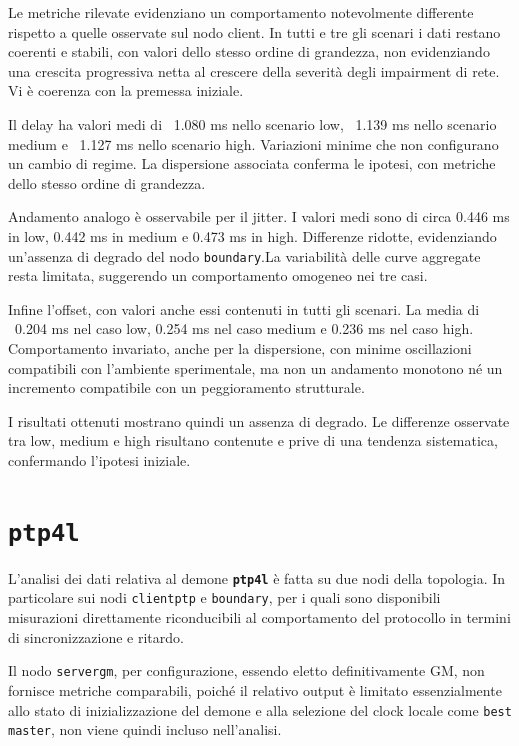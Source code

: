 Le metriche rilevate evidenziano un comportamento notevolmente differente
rispetto a quelle osservate sul nodo client. In tutti e tre gli scenari i dati restano
coerenti e stabili, con valori dello stesso ordine di grandezza, non evidenziando
una crescita progressiva netta al crescere della severità degli impairment di rete.
Vi è coerenza con la premessa iniziale.

Il delay ha valori medi di ~1.080 ms nello scenario low, ~1.139 ms nello scenario
medium e ~1.127 ms nello scenario high. Variazioni minime che non configurano un cambio
di regime. La dispersione associata conferma le ipotesi, con metriche dello stesso
ordine di grandezza.

Andamento analogo è osservabile per il jitter. I valori medi sono di circa 0.446
ms in low, 0.442 ms in medium e 0.473 ms in high. Differenze ridotte, evidenziando
un'assenza di degrado del nodo \texttt{boundary}.La variabilità delle curve
aggregate resta limitata, suggerendo un comportamento omogeneo nei tre casi.

Infine l'offset, con valori anche essi contenuti in tutti gli scenari. La media di
~0.204 ms nel caso low, 0.254 ms nel caso medium e 0.236 ms nel caso high.
Comportamento invariato, anche per la dispersione, con minime oscillazioni
compatibili con l'ambiente sperimentale, ma non un andamento monotono né un incremento
compatibile con un peggioramento strutturale.

I risultati ottenuti mostrano quindi un assenza di degrado. Le differenze
osservate tra low, medium e high risultano contenute e prive di una tendenza sistematica,
confermando l'ipotesi iniziale.

\section{\texttt{ptp4l}}
L'analisi dei dati relativa al demone \texttt{\textbf{ptp4l}} è fatta su due nodi
della topologia. In particolare sui nodi \texttt{clientptp} e \texttt{boundary}, per
i quali sono disponibili misurazioni direttamente riconducibili al comportamento del
protocollo in termini di sincronizzazione e ritardo.

Il nodo \texttt{servergm}, per configurazione, essendo eletto definitivamente GM,
non fornisce metriche comparabili, poiché il relativo output è limitato
essenzialmente allo stato di inizializzazione del demone e alla selezione del
clock locale come \texttt{best master}, non viene quindi incluso nell'analisi.

